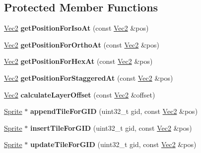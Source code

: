 \subsection*{Protected Member Functions}
\begin{DoxyCompactItemize}
\item 
\mbox{\label{classTMXLayer_a3e04602227f8a60685d38eb54067c228}} 
\hyperlink{classVec2}{Vec2} {\bfseries get\+Position\+For\+Iso\+At} (const \hyperlink{classVec2}{Vec2} \&pos)
\item 
\mbox{\label{classTMXLayer_a0d7d36f39707f0d9dab8632af01cfc96}} 
\hyperlink{classVec2}{Vec2} {\bfseries get\+Position\+For\+Ortho\+At} (const \hyperlink{classVec2}{Vec2} \&pos)
\item 
\mbox{\label{classTMXLayer_ab9b894b913d4fe0dd7c2916131d480f9}} 
\hyperlink{classVec2}{Vec2} {\bfseries get\+Position\+For\+Hex\+At} (const \hyperlink{classVec2}{Vec2} \&pos)
\item 
\mbox{\label{classTMXLayer_a2814e6c370d49fa07362688c63879f4a}} 
\hyperlink{classVec2}{Vec2} {\bfseries get\+Position\+For\+Staggered\+At} (const \hyperlink{classVec2}{Vec2} \&pos)
\item 
\mbox{\label{classTMXLayer_a429b05f5840cdebf4591a93ae3571068}} 
\hyperlink{classVec2}{Vec2} {\bfseries calculate\+Layer\+Offset} (const \hyperlink{classVec2}{Vec2} \&offset)
\item 
\mbox{\label{classTMXLayer_a1dfa4507e6d887eeb33ca2c15d5c6138}} 
\hyperlink{classSprite}{Sprite} $\ast$ {\bfseries append\+Tile\+For\+G\+ID} (uint32\+\_\+t gid, const \hyperlink{classVec2}{Vec2} \&pos)
\item 
\mbox{\label{classTMXLayer_abcdfb314cab5e366f0a74dca4c1bae3a}} 
\hyperlink{classSprite}{Sprite} $\ast$ {\bfseries insert\+Tile\+For\+G\+ID} (uint32\+\_\+t gid, const \hyperlink{classVec2}{Vec2} \&pos)
\item 
\mbox{\label{classTMXLayer_a08295c73e0f50f9c0facbf1ce8d384f5}} 
\hyperlink{classSprite}{Sprite} $\ast$ {\bfseries update\+Tile\+For\+G\+ID} (uint32\+\_\+t gid, const \hyperlink{classVec2}{Vec2} \&pos)

\end{DoxyCompactItemize}
